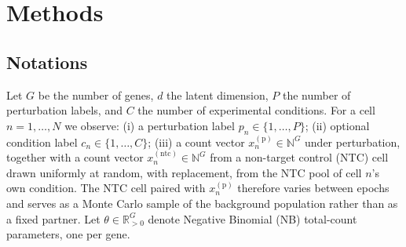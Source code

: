 %
%

\section{Methods}

\subsection{Notations}
Let $G$ be the number of genes, $d$ the latent dimension, $P$ the number of perturbation labels, and
$C$ the number of experimental conditions. For a cell $n=1,\dots,N$ we observe: (i) a perturbation
label $p_n \in \{1,\dots,P\}$; (ii) optional condition label $c_n \in \{1,\dots,C\}$; (iii) a count
vector $x^{(\mathrm{p})}_n \in \mathbb{N}^G$ under perturbation, together with a count vector
$x^{(\mathrm{ntc})}_n \in \mathbb{N}^G$ from a non-target control (NTC) cell drawn uniformly at
random, with replacement, from the NTC pool of cell $n$'s own condition. The NTC cell paired with
$x^{(\mathrm{p})}_n$ therefore varies between epochs and serves as a Monte Carlo sample of the
background population rather than as a fixed partner. Let $\theta \in \mathbb{R}^G_{>0}$ denote
Negative Binomial (NB) total-count parameters, one per gene.

